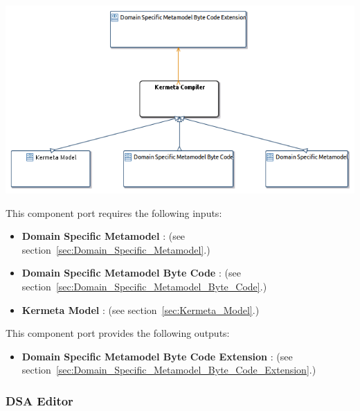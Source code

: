 \documentclass{gemoc} %
\begin{document}

\begin{center}
\includegraphics*[trim=0.0cm 0.0cm 0cm 0.0cm, clip=true]{../images/generated/Generated_Kermeta_Compiler.png}
\end{center}

This component port requires the following inputs:
\begin{itemize}
  \item \textbf{Domain Specific Metamodel} :
(see section~\ref{sec:Domain_Specific_Metamodel}.)
  \item \textbf{Domain Specific Metamodel Byte Code} :
(see section~\ref{sec:Domain_Specific_Metamodel_Byte_Code}.)
  \item \textbf{Kermeta Model} :
(see section~\ref{sec:Kermeta_Model}.)
\end{itemize}

This component port provides the following outputs:
\begin{itemize}
  \item \textbf{Domain Specific Metamodel Byte Code Extension} :
(see section~\ref{sec:Domain_Specific_Metamodel_Byte_Code_Extension}.)
\end{itemize}



\subsubsection{DSA Editor}
\label{sec:DSA_Editor}
\end{document}
